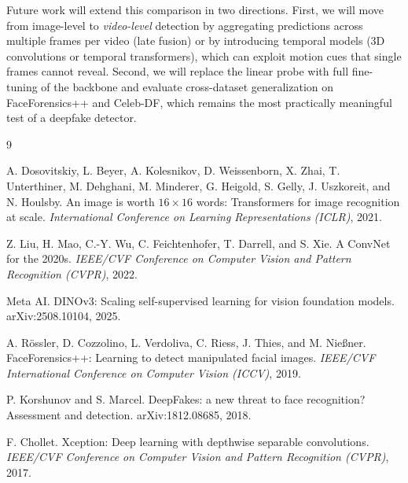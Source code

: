 \documentclass[11pt,a4paper]{article}
\begin{document}
Future work will extend this comparison in two directions. First, we will move from image-level to
\emph{video-level} detection by aggregating predictions across multiple frames per video (late
fusion) or by introducing temporal models (3D convolutions or temporal transformers), which can
exploit motion cues that single frames cannot reveal. Second, we will replace the linear probe
with full fine-tuning of the backbone and evaluate cross-dataset generalization on FaceForensics++
and Celeb-DF, which remains the most practically meaningful test of a deepfake detector.


\begin{thebibliography}{9}

A. Dosovitskiy, L. Beyer, A. Kolesnikov, D. Weissenborn, X. Zhai, T. Unterthiner,
M. Dehghani, M. Minderer, G. Heigold, S. Gelly, J. Uszkoreit, and N. Houlsby.
An image is worth $16\times16$ words: Transformers for image recognition at scale.
\emph{International Conference on Learning Representations (ICLR)}, 2021.

Z. Liu, H. Mao, C.-Y. Wu, C. Feichtenhofer, T. Darrell, and S. Xie.
A ConvNet for the 2020s.
\emph{IEEE/CVF Conference on Computer Vision and Pattern Recognition (CVPR)}, 2022.

Meta AI. DINOv3: Scaling self-supervised learning for vision foundation models.
arXiv:2508.10104, 2025.

A. R\"ossler, D. Cozzolino, L. Verdoliva, C. Riess, J. Thies, and M. Nie{\ss}ner.
FaceForensics++: Learning to detect manipulated facial images.
\emph{IEEE/CVF International Conference on Computer Vision (ICCV)}, 2019.

P. Korshunov and S. Marcel.
DeepFakes: a new threat to face recognition? Assessment and detection.
arXiv:1812.08685, 2018.

F. Chollet.
Xception: Deep learning with depthwise separable convolutions.
\emph{IEEE/CVF Conference on Computer Vision and Pattern Recognition (CVPR)}, 2017.

\end{thebibliography}
\end{document}

